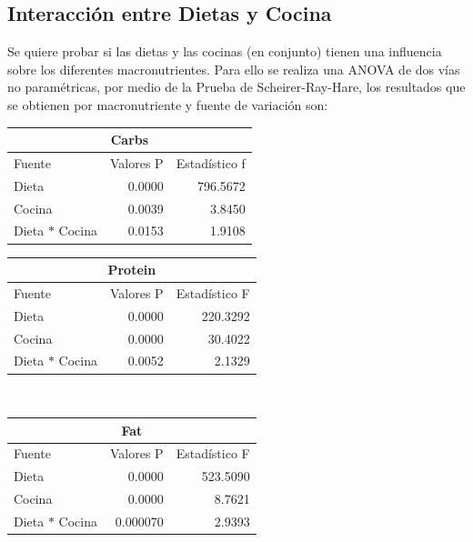 \documentclass[12pt,a4paper]{article}
\begin{document}
{        \subsection{Interacción entre Dietas y Cocina}
        {
            Se quiere probar si las dietas y las cocinas (en conjunto) tienen una influencia 
            sobre los diferentes macronutrientes. Para ello se realiza una ANOVA de dos vías 
            no paramétricas, por medio de la Prueba de Scheirer-Ray-Hare, los resultados que 
            se obtienen por macronutriente y fuente de variación son:

            \begin{center}
                \begin{tabular}{lrr}
                \toprule
                    \multicolumn{3}{c}{Carbs} \\
                \midrule
                    Fuente & Valores P & Estadístico f \\
                \midrule
                    Dieta               & 0.0000 & 796.5672 \\
                    Cocina              & 0.0039 &   3.8450 \\
                    Dieta $\ast$ Cocina & 0.0153 &   1.9108 \\
                \bottomrule
                \end{tabular}
                \vspace*{0.5cm}
                \begin{tabular}{lrr}
                    \toprule
                    \multicolumn{3}{c}{Protein} \\
                \midrule
                    Fuente & Valores P & Estadístico F \\
                \midrule
                    Dieta               & 0.0000 & 220.3292 \\
                    Cocina              & 0.0000 &  30.4022 \\
                    Dieta $\ast$ Cocina & 0.0052 &   2.1329 \\
                \bottomrule
                \end{tabular}\\
                \vspace*{0.1cm}
                \begin{tabular}{lrr}
                    \toprule
                    \multicolumn{3}{c}{Fat} \\
                \midrule
                    Fuente & Valores P & Estadístico F \\
                \midrule
                    Dieta               & 0.0000   & 523.5090 \\
                    Cocina              & 0.0000   &   8.7621 \\
                    Dieta $\ast$ Cocina & 0.000070 &   2.9393 \\
                \bottomrule
                \end{tabular}
            \end{center}

}}
\end{document}
